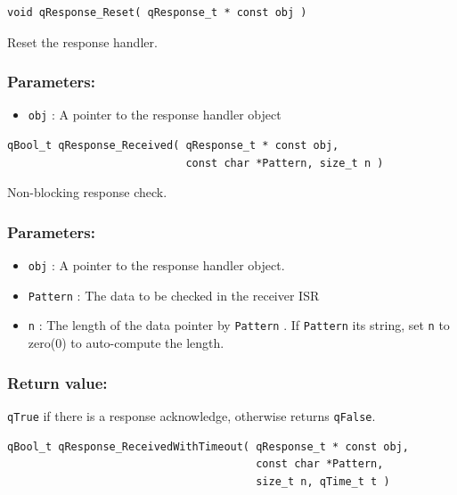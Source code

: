 \documentclass{article}
\begin{document}
\noindent\hrulefill

\begin{lstlisting}[style=CStyle]
void qResponse_Reset( qResponse_t * const obj )
\end{lstlisting}

Reset the response handler. 

\subsubsection*{Parameters:}
\begin{itemize}
    \item \lstinline{obj} : A pointer to the response handler object
\end{itemize}

\noindent\hrulefill

\begin{lstlisting}[style=CStyle]
qBool_t qResponse_Received( qResponse_t * const obj, 
                            const char *Pattern, size_t n )
\end{lstlisting}

Non-blocking response check. 

\subsubsection*{Parameters:}
\begin{itemize}
    \item \lstinline{obj} : A pointer to the response handler object.
    \item \lstinline{Pattern} : The data to be checked in the receiver ISR
    \item \lstinline{n} : The length of the data pointer by \lstinline{Pattern} . If \lstinline{Pattern} its string, set \lstinline{n} to zero(0) to auto-compute the length.
\end{itemize}

\subsubsection*{Return value:}
\lstinline{qTrue} if there is a response acknowledge, otherwise returns \lstinline{qFalse}.

\noindent\hrulefill

\begin{lstlisting}[style=CStyle]
qBool_t qResponse_ReceivedWithTimeout( qResponse_t * const obj, 
                                       const char *Pattern, 
                                       size_t n, qTime_t t )
\end{lstlisting}
\end{document}
